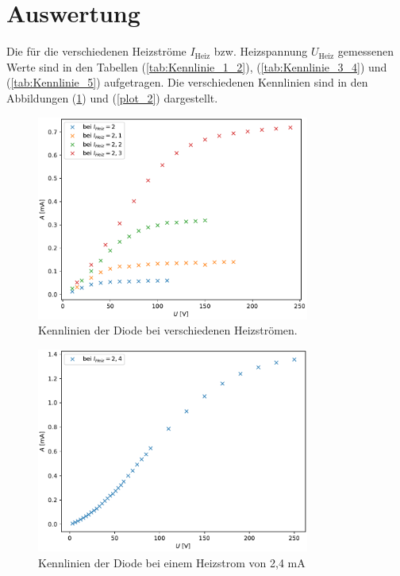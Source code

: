 \section{Auswertung}
\label{sec:Auswertung}

Die für die verschiedenen Heizströme $I_{\text{Heiz}}$ bzw. Heizspannung $U_{\text{Heiz}}$ gemessenen Werte sind in den Tabellen (\ref{tab:Kennlinie_1_2}),
(\ref{tab:Kennlinie_3_4}) und (\ref{tab:Kennlinie_5}) aufgetragen. Die verschiedenen Kennlinien sind in den Abbildungen (\ref{fig:plot_1}) und (\ref{plot_2}) dargestellt. 

\begin{figure}
    \centering
    \includegraphics[width=0.8\textwidth]{plot_1.pdf}
    \caption{Kennlinien der Diode bei verschiedenen Heizströmen.}
    \label{fig:plot_1}
\end{figure}
\begin{figure}
      \centering
      \includegraphics[width=0.8\textwidth]{plot_2.pdf}
      \caption{Kennlinien der Diode bei einem Heizstrom von 2,4 mA}
      \label{fig:plot_2}
\end{figure}

